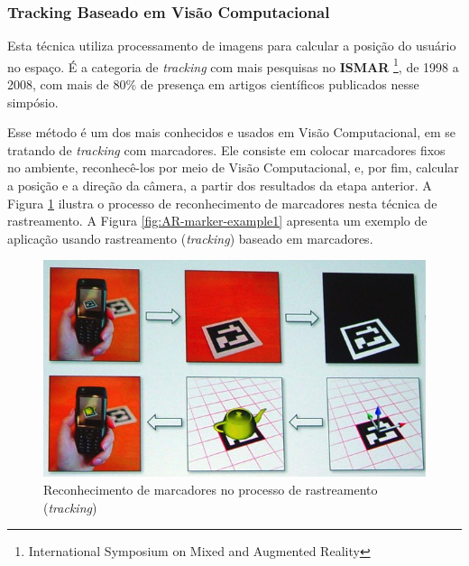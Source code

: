 \subsubsection{Tracking Baseado em Visão Computacional}

Esta técnica utiliza processamento de imagens para calcular a posição do usuário no espaço. 
É a categoria de \textit{tracking} com mais pesquisas no \textbf{ISMAR}
\footnote{International Symposium on Mixed and Augmented Reality}, 
de 1998 a 2008, com mais
de 80\% de presença em artigos científicos publicados nesse simpósio.

Esse método é um dos mais conhecidos e usados em Visão Computacional, em se tratando de
\textit{tracking} com marcadores. Ele consiste em
colocar marcadores fixos no ambiente, reconhecê-los por meio de Visão Computacional, e,
por fim, calcular a posição e a direção da câmera, a partir dos resultados da etapa anterior.
A Figura \ref{fig:AR-marker} ilustra o processo de reconhecimento de marcadores nesta
técnica de rastreamento. A Figura \ref{fig:AR-marker-example1} apresenta um exemplo de aplicação
usando rastreamento (\textit{tracking}) baseado em marcadores.

\begin{figure}[h!]
    \centering
    \caption{Reconhecimento de marcadores no processo de rastreamento (\textit{tracking})}
    \label{fig:AR-marker}
    \includegraphics[width=15cm]{resources/marker-tracking.jpg}
\end{figure}



